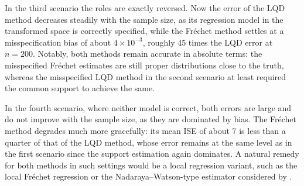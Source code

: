 In the third scenario the roles are exactly reversed. Now the error of the LQD
method decreases steadily with the sample size, as its regression model in the
transformed space is correctly specified, while the Fréchet method settles at a
misspecification bias of about $4 \times 10^{-3}$, roughly 45 times the LQD error
at $n = 200$. Notably, both methods remain accurate in absolute terms: the
misspecified Fréchet estimates are still proper distributions close to the truth,
whereas the misspecified LQD method in the second scenario at least required the
common support to achieve the same.

In the fourth scenario, where neither model is correct, both errors are large and
do not improve with the sample size, as they are dominated by bias. The Fréchet
method degrades much more gracefully: its mean ISE of about 7 is less than a
quarter of that of the LQD method, whose error remains at the same level as in the
first scenario since the support estimation again dominates. A natural remedy for
both methods in such settings would be a local regression variant, such as the
local Fréchet regression or the Nadaraya--Watson-type estimator considered by
\textcite{PetersenMüller2019}.
